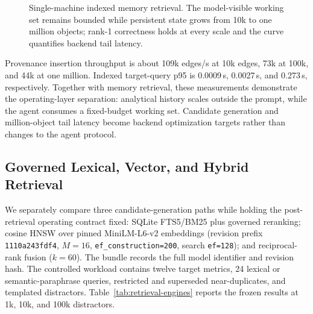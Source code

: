 \documentclass[10pt]{article}
\newcommand{\code}[1]{\texttt{#1}}
\begin{document}
\begin{figure}[H]
\centering
{}
\caption{Single-machine indexed memory retrieval. The model-visible working set remains bounded while persistent state grows from 10k to one million objects; rank-1 correctness holds at every scale and the curve quantifies backend tail latency.}
\label{fig:scale-latency}
\end{figure}

Provenance insertion throughput is about 109k edges/s at 10k edges, 73k at 100k, and 44k at one million. Indexed target-query p95 is 0.0009\,s, 0.0027\,s, and 0.273\,s, respectively. Together with memory retrieval, these measurements demonstrate the operating-layer separation: analytical history scales outside the prompt, while the agent consumes a fixed-budget working set. Candidate generation and million-object tail latency become backend optimization targets rather than changes to the agent protocol.

\subsection{Governed Lexical, Vector, and Hybrid Retrieval}
We separately compare three candidate-generation paths while holding the post-retrieval operating contract fixed: SQLite FTS5/BM25 plus governed reranking; cosine HNSW over pinned MiniLM-L6-v2 embeddings (revision prefix \code{1110a243fdf4}, $M=16$, \code{ef\_construction=200}, search \code{ef=128}); and reciprocal-rank fusion ($k=60$). The bundle records the full model identifier and revision hash. The controlled workload contains twelve target metrics, 24 lexical or semantic-paraphrase queries, restricted and superseded near-duplicates, and templated distractors. Table~\ref{tab:retrieval-engines} reports the frozen results at 1k, 10k, and 100k distractors.
\end{document}
